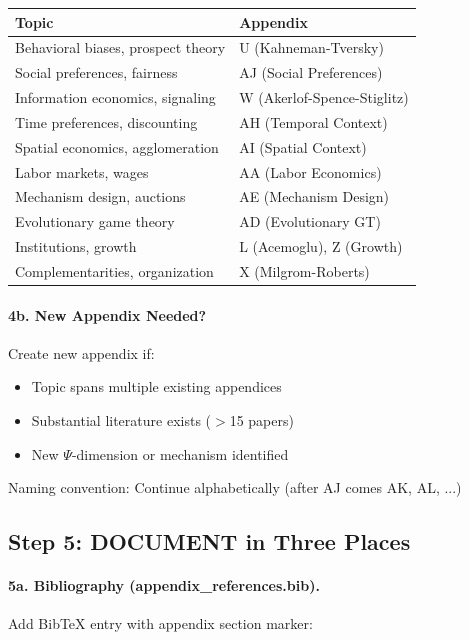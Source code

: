 \begin{center}
\renewcommand{\arraystretch}{1.2}
\begin{tabular}{|l|l|}
\hline
\textbf{Topic} & \textbf{Appendix} \\
\hline
Behavioral biases, prospect theory & U (Kahneman-Tversky) \\
Social preferences, fairness & AJ (Social Preferences) \\
Information economics, signaling & W (Akerlof-Spence-Stiglitz) \\
Time preferences, discounting & AH (Temporal Context) \\
Spatial economics, agglomeration & AI (Spatial Context) \\
Labor markets, wages & AA (Labor Economics) \\
Mechanism design, auctions & AE (Mechanism Design) \\
Evolutionary game theory & AD (Evolutionary GT) \\
Institutions, growth & L (Acemoglu), Z (Growth) \\
Complementarities, organization & X (Milgrom-Roberts) \\
\hline
\end{tabular}
\end{center}

\paragraph{4b. New Appendix Needed?}
Create new appendix if:
\begin{itemize}
  \item Topic spans multiple existing appendices
  \item Substantial literature exists ($>$15 papers)
  \item New $\Psi$-dimension or mechanism identified
\end{itemize}

Naming convention: Continue alphabetically (after AJ comes AK, AL, ...)

\subsection{Step 5: DOCUMENT in Three Places}

\paragraph{5a. Bibliography (appendix\_references.bib).}
Add BibTeX entry with appendix section marker:

